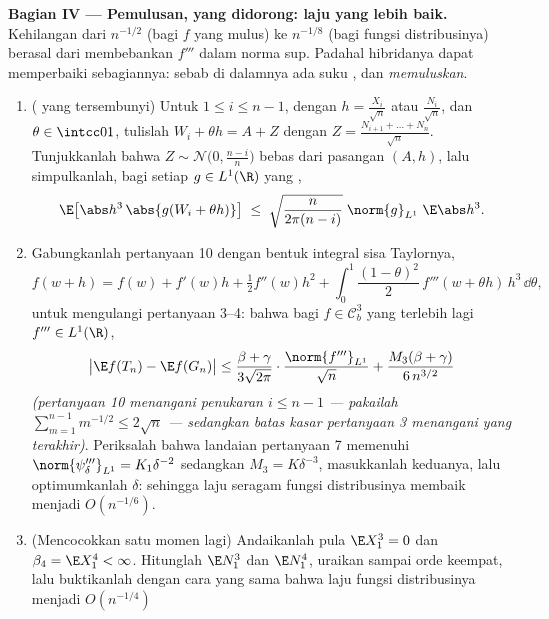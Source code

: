 \begin{problem}
\medskip
\noindent\textbf{Bagian IV --- Pemulusan, yang didorong: laju
yang lebih baik.} Kehilangan dari $n^{-1/2}$ (bagi $f$ yang mulus) ke
$n^{-1/8}$ (bagi fungsi distribusinya) berasal dari membebankan
$f'''$ dalam norma sup. Padahal hibridanya dapat memperbaiki sebagiannya: sebab
di dalamnya ada suku , dan  \emph{memuluskan}.
\begin{enumerate}[resume]
  \item ( yang tersembunyi) Untuk $1 \leq i \leq n - 1$, dengan $h =
        \frac{X_i}{\sqrt n}$ atau $\frac{N_i}{\sqrt n}$, dan
        $\theta \in \intcc01$, tulislah $W_i + \theta h = A +
        Z$ dengan $Z = \frac{N_{i+1} + \dots + N_n}{\sqrt
        n}$. Tunjukkanlah bahwa $Z \sim \mathcal N\bigl(0,
        \frac{n-i}n\bigr)$ bebas dari pasangan $(A,
        h)$, lalu simpulkanlah, bagi setiap $g \in
        L^1(\R)$ yang ,
        \[
        \E\bigl[\abs h^3\,\abs{g(W_i + \theta h)}\bigr]
        \;\leq\; \sqrt{\frac{n}{2\pi(n - i)}}\;
        \norm{g}_{L^1}\;\E\abs h^3 .
        \]
  \item Gabungkanlah pertanyaan 10 dengan bentuk integral
        sisa Taylornya,
        \[
        f(w + h) = f(w) + f'(w)h + \tfrac12f''(w)h^2 +
        \int_0^1\frac{(1 - \theta)^2}2\,f'''(w + \theta
        h)\,h^3\,\dd\theta,
        \]
        untuk mengulangi pertanyaan 3--4: bahwa bagi $f \in \mathcal C^3_b$
        yang terlebih lagi $f''' \in L^1(\R)$,
        \[
        \bigl|\E f(T_n) - \E f(G_n)\bigr| \leq
        \frac{\beta + \gamma}{3\sqrt{2\pi}}\cdot
        \frac{\norm{f'''}_{L^1}}{\sqrt n} +
        \frac{M_3(\beta + \gamma)}{6\,n^{3/2}}
        \]
        \emph{(pertanyaan 10 menangani penukaran $i \leq n - 1$
        --- pakailah $\sum_{m=1}^{n-1}m^{-1/2} \leq 2\sqrt n$
        --- sedangkan batas kasar pertanyaan 3 menangani yang
        terakhir)}. Periksalah bahwa landaian pertanyaan 7 memenuhi
        $\norm{\psi_\delta'''}_{L^1} = K_1\delta^{-2}$
        sedangkan $M_3 = K\delta^{-3}$, masukkanlah keduanya, lalu
        optimumkanlah $\delta$: sehingga laju seragam
        fungsi distribusinya membaik menjadi
        $O(n^{-1/6})$.
  \item (Mencocokkan satu momen lagi) Andaikanlah pula $\E
        X_1^3 = 0$ dan $\beta_4 = \E X_1^4 < \infty$.
        Hitunglah $\E N_1^3$ dan $\E N_1^4$, uraikan sampai orde
        keempat, lalu buktikanlah dengan cara yang sama bahwa
        laju fungsi distribusinya menjadi $O(n^{-1/4})$

\end{enumerate}
\end{problem}
